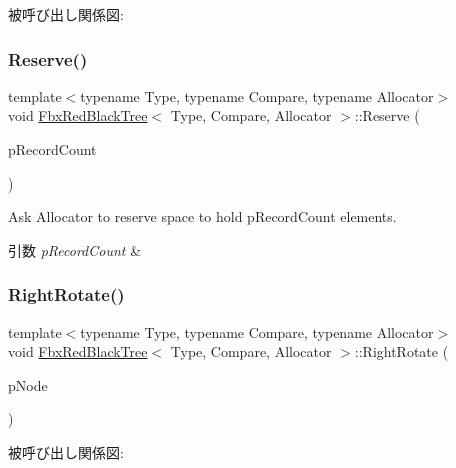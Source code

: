被呼び出し関係図\+:
\mbox{\label{class_fbx_red_black_tree_a707730fca6c73fea996c8354a0a6ead2}} 
\subsubsection{\texorpdfstring{Reserve()}{Reserve()}}
{\footnotesize\ttfamily template$<$typename Type, typename Compare, typename Allocator$>$ \\
void \hyperlink{class_fbx_red_black_tree}{Fbx\+Red\+Black\+Tree}$<$ Type, Compare, Allocator $>$\+::Reserve (\begin{DoxyParamCaption}\item[{unsigned int}]{p\+Record\+Count }\end{DoxyParamCaption})}

Ask Allocator to reserve space to hold p\+Record\+Count elements. 
\begin{DoxyParams}{引数}
{\em p\+Record\+Count} & \\
\hline
\end{DoxyParams}
\mbox{\label{class_fbx_red_black_tree_a390eaccc303de294803e1fd2272cbc73}} 
\subsubsection{\texorpdfstring{Right\+Rotate()}{RightRotate()}}
{\footnotesize\ttfamily template$<$typename Type, typename Compare, typename Allocator$>$ \\
void \hyperlink{class_fbx_red_black_tree}{Fbx\+Red\+Black\+Tree}$<$ Type, Compare, Allocator $>$\+::Right\+Rotate (\begin{DoxyParamCaption}\item[{\hyperlink{class_fbx_red_black_tree_1_1_record_type}{Record\+Type} $\ast$}]{p\+Node }\end{DoxyParamCaption})\hspace{0.3cm}{\ttfamily [protected]}}

被呼び出し関係図\+:
\mbox{\label{class_fbx_red_black_tree_a634b41949b2cdef5488abcb444f896c6}} 
